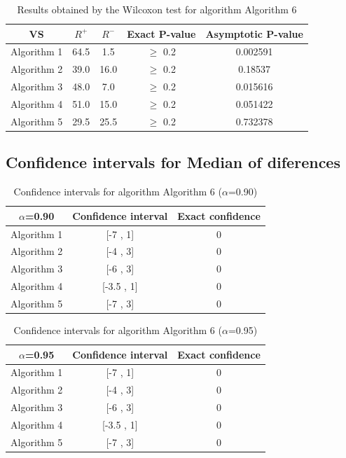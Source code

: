\documentclass[a4paper,10pt]{article}
\begin{document}
\begin{table}[!htp]
\centering\small
\begin{tabular}{
|c|c|c|c|c|}
\hline
 VS & $R^{+}$ & $R^{-}$ & Exact P-value & Asymptotic P-value \\ \hline 
Algorithm 1 & 64.5 & 1.5 & $\geq$ 0.2 & 0.002591\\ \hline 
Algorithm 2 & 39.0 & 16.0 & $\geq$ 0.2 & 0.18537\\ \hline 
Algorithm 3 & 48.0 & 7.0 & $\geq$ 0.2 & 0.015616\\ \hline 
Algorithm 4 & 51.0 & 15.0 & $\geq$ 0.2 & 0.051422\\ \hline 
Algorithm 5 & 29.5 & 25.5 & $\geq$ 0.2 & 0.732378\\ \hline 

\end{tabular}
\caption{Results obtained by the Wilcoxon test for algorithm Algorithm 6}
\end{table}

\subsection{Confidence intervals for Median of diferences}

\begin{table}[!htp]
\centering\small
\begin{tabular}{
|c|c|c|}
\hline
 $\alpha$=0.90 & Confidence interval & Exact confidence \\ \hline 
Algorithm 1 & [-7 , 1] & 0\\ \hline 
Algorithm 2 & [-4 , 3] & 0\\ \hline 
Algorithm 3 & [-6 , 3] & 0\\ \hline 
Algorithm 4 & [-3.5 , 1] & 0\\ \hline 
Algorithm 5 & [-7 , 3] & 0\\ \hline 

\end{tabular}
\caption{Confidence intervals for algorithm Algorithm 6 ($\alpha$=0.90)}
\end{table}
\begin{table}[!htp]
\centering\small
\begin{tabular}{
|c|c|c|}
\hline
 $\alpha$=0.95 & Confidence interval & Exact confidence \\ \hline 
Algorithm 1 & [-7 , 1] & 0\\ \hline 
Algorithm 2 & [-4 , 3] & 0\\ \hline 
Algorithm 3 & [-6 , 3] & 0\\ \hline 
Algorithm 4 & [-3.5 , 1] & 0\\ \hline 
Algorithm 5 & [-7 , 3] & 0\\ \hline 

\end{tabular}
\caption{Confidence intervals for algorithm Algorithm 6 ($\alpha$=0.95)}
\end{table}

 \clearpage 
\end{document}
